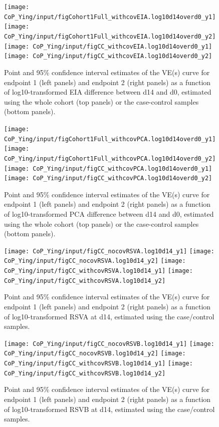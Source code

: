 \documentclass[11pt]{article}
\begin{document}
\begin{figure}[H]
    \centering
    \texttt{[image: CoP\_Ying/input/figCohort1Full\_withcovEIA.log10d14overd0\_y1]}
    \texttt{[image: CoP\_Ying/input/figCohort1Full\_withcovEIA.log10d14overd0\_y2]}
    \texttt{[image: CoP\_Ying/input/figCC\_withcovEIA.log10d14overd0\_y1]}
    \texttt{[image: CoP\_Ying/input/figCC\_withcovEIA.log10d14overd0\_y2]}
    \caption{Point and 95\% confidence interval estimates of the VE(s) curve for endpoint 1 (left panels) and endpoint 2 (right panels) as a function of log10-transformed EIA difference between d14 and d0, estimated using the whole cohort (top panels) or the case-control samples (bottom panels).}
    \label{fig:yingfig1}
    \end{figure}

\begin{figure}[H]
    \centering
    \texttt{[image: CoP\_Ying/input/figCohort1Full\_withcovPCA.log10d14overd0\_y1]}
    \texttt{[image: CoP\_Ying/input/figCohort1Full\_withcovPCA.log10d14overd0\_y2]}
    \texttt{[image: CoP\_Ying/input/figCC\_withcovPCA.log10d14overd0\_y1]}
    \texttt{[image: CoP\_Ying/input/figCC\_withcovPCA.log10d14overd0\_y2]}
    \caption{Point and 95\% confidence interval estimates of the VE(s) curve for endpoint 1 (left panels) and endpoint 2 (right panels) as a function of log10-transformed PCA difference between d14 and d0, estimated using the whole cohort (top panels) or the case-control samples (bottom panels).}
    \label{fig:yingfig2}
    \end{figure}

\begin{figure}[H]
    \centering
    \texttt{[image: CoP\_Ying/input/figCC\_nocovRSVA.log10d14\_y1]}
    \texttt{[image: CoP\_Ying/input/figCC\_nocovRSVA.log10d14\_y2]}
    \texttt{[image: CoP\_Ying/input/figCC\_withcovRSVA.log10d14\_y1]}
    \texttt{[image: CoP\_Ying/input/figCC\_withcovRSVA.log10d14\_y2]}
    \caption{Point and 95\% confidence interval estimates of the VE(s) curve for endpoint 1 (left panels) and endpoint 2 (right panels) as a function of log10-transformed RSVA at d14, estimated using the case/control samples.}
    \label{fig:yingfig3}
    \end{figure}

\begin{figure}[H]
    \centering
    \texttt{[image: CoP\_Ying/input/figCC\_nocovRSVB.log10d14\_y1]}
    \texttt{[image: CoP\_Ying/input/figCC\_nocovRSVB.log10d14\_y2]}
    \texttt{[image: CoP\_Ying/input/figCC\_withcovRSVB.log10d14\_y1]}
    \texttt{[image: CoP\_Ying/input/figCC\_withcovRSVB.log10d14\_y2]}
    \caption{Point and 95\% confidence interval estimates of the VE(s) curve for endpoint 1 (left panels) and endpoint 2 (right panels) as a function of log10-transformed RSVB at d14, estimated using the case/control samples.}
    \label{fig:yingfig4}
    \end{figure}
\end{document}
